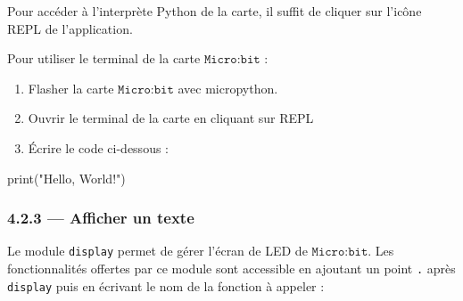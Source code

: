 \documentclass[a4paper,17pt]{extarticle}
\providecommand{\tightlist}{%
      \setlength{\itemsep}{0pt}\setlength{\parskip}{0pt}}
\newenvironment{Shaded}{}{}
\newcommand{\StringTok}[1]{\textcolor[rgb]{0.25,0.44,0.63}{{#1}}}
\newcommand{\NormalTok}[1]{{#1}}
\newcommand{\BuiltInTok}[1]{{#1}}
\begin{document}
Pour accéder à l'interprète Python de la carte, il suffit de cliquer sur
l'icône REPL de l'application.
\begin{exemple}
    Pour utiliser le terminal de la carte \(\texttt{Micro:bit}\) :

\begin{enumerate}
\def\labelenumi{\arabic{enumi}.}
\tightlist
\item
  Flasher la carte \(\texttt{Micro:bit}\) avec micropython.
\item
  Ouvrir le terminal de la carte en cliquant sur REPL
\item
  Écrire le code ci-dessous :
\end{enumerate}

\begin{Shaded}
\begin{Highlighting}[]
\BuiltInTok{print}\NormalTok{(}\StringTok{"Hello, World!"}\NormalTok{)}
\end{Highlighting}
\end{Shaded}

        \end{exemple}
    \hypertarget{afficher-un-texte}{%
\subsubsection{4.2.3 --- Afficher un texte}\label{afficher-un-texte}}

    Le module \texttt{display} permet de gérer l'écran de LED de
\(\texttt{Micro:bit}\). Les fonctionnalités offertes par ce module sont
accessible en ajoutant un point
\texttt{\textquotesingle{}.\textquotesingle{}} après
\texttt{\textquotesingle{}display\textquotesingle{}} puis en écrivant le
nom de la fonction à appeler :
\end{document}
